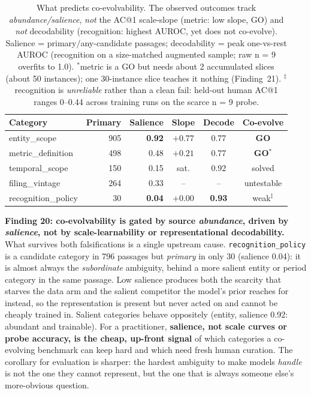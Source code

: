 \begin{table}[t]
\centering
\caption{What predicts co-evolvability. The observed outcomes track
\emph{abundance/salience}, \emph{not} the AC@1 scale-slope (metric: low slope,
GO) and \emph{not} decodability (recognition: highest AUROC, yet does not
co-evolve). Salience = primary$/$any-candidate passages; decodability = peak
one-vs-rest AUROC (recognition on a size-matched augmented sample; raw n = 9
overfits to 1.0). $^*$metric is a GO but needs about 2 accumulated slices
(about 50 instances); one 30-instance slice teaches it nothing (Finding~21).
$^\ddagger$recognition is \emph{unreliable} rather than a clean fail: held-out human
AC@1 ranges 0--0.44 across training runs on the scarce n = 9 probe.}
\label{tab:learnability}
\small
\begin{tabular}{lrrccc}
\toprule
Category & Primary & Salience & Slope & Decode & Co-evolve \\
\midrule
entity\_scope       & 905 & \textbf{0.92} & $+0.77$ & 0.77 & \textbf{GO} \\
metric\_definition  & 498 & 0.48 & $+0.21$ & 0.77 & \textbf{GO}$^*$ \\
temporal\_scope     & 150 & 0.15 & sat.    & 0.92 & solved \\
filing\_vintage     & 264 & 0.33 & --      & --   & untestable \\
recognition\_policy &  30 & \textbf{0.04} & $+0.00$ & \textbf{0.93} & weak$^{\ddagger}$ \\
\bottomrule
\end{tabular}
\end{table}

\textbf{Finding 20: co-evolvability is gated by source \emph{abundance}, driven by
\emph{salience}, not by scale-learnability or representational decodability.} What
survives both falsifications is a single upstream cause. \texttt{recognition\_policy}
is a candidate category in 796 passages but \emph{primary} in only 30 (salience
0.04): it is almost always the \emph{subordinate} ambiguity, behind a more salient
entity or period category in the same passage. Low salience produces both the scarcity
that starves the data arm and the salient competitor the model's prior reaches for
instead, so the representation is present but never acted on and cannot be cheaply
trained in. Salient categories behave oppositely (entity, salience 0.92: abundant and
trainable). For a practitioner, \textbf{salience, not scale curves or probe
accuracy, is the cheap, up-front signal} of which categories a co-evolving benchmark can
keep hard and which need fresh human curation. The corollary for evaluation is
sharper: the hardest ambiguity to make models \emph{handle} is not the one they
cannot represent, but the one that is always someone else's more-obvious question.


